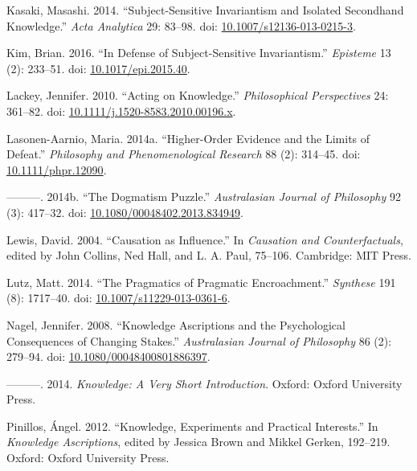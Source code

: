 \documentclass[
  10pt,
  letterpaper,
  DIV=11,
  numbers=noendperiod,
  twoside]{scrartcl}
\newlength{\cslhangindent}
\newenvironment{CSLReferences}[2] %
 {\begin{list}{}{%
  \setlength{\itemindent}{0pt}
  \setlength{\leftmargin}{0pt}
  \setlength{\parsep}{0pt}
  \ifodd #1
   \setlength{\leftmargin}{\cslhangindent}
   \setlength{\itemindent}{-1\cslhangindent}
  \fi
  \setlength{\itemsep}{#2\baselineskip}}}
 {\end{list}}
\begin{document}
\begin{CSLReferences}{1}{0}
Kasaki, Masashi. 2014. {``Subject-Sensitive Invariantism and Isolated
Secondhand Knowledge.''} \emph{Acta Analytica} 29: 83--98. doi:
\href{https://doi.org/10.1007/s12136-013-0215-3}{10.1007/s12136-013-0215-3}.

Kim, Brian. 2016. {``In Defense of Subject-Sensitive Invariantism.''}
\emph{Episteme} 13 (2): 233--51. doi:
\href{https://doi.org/10.1017/epi.2015.40}{10.1017/epi.2015.40}.

Lackey, Jennifer. 2010. {``Acting on Knowledge.''} \emph{Philosophical
Perspectives} 24: 361--82. doi:
\href{https://doi.org/10.1111/j.1520-8583.2010.00196.x}{10.1111/j.1520-8583.2010.00196.x}.

Lasonen-Aarnio, Maria. 2014a. {``Higher-Order Evidence and the Limits of
Defeat.''} \emph{Philosophy and Phenomenological Research} 88 (2):
314--45. doi:
\href{https://doi.org/10.1111/phpr.12090}{10.1111/phpr.12090}.

---------. 2014b. {``The Dogmatism Puzzle.''} \emph{Australasian Journal
of Philosophy} 92 (3): 417--32. doi:
\href{https://doi.org/10.1080/00048402.2013.834949}{10.1080/00048402.2013.834949}.

Lewis, David. 2004. {``Causation as Influence.''} In \emph{Causation and
Counterfactuals}, edited by John Collins, Ned Hall, and L. A. Paul,
75--106. Cambridge: {MIT} Press.

Lutz, Matt. 2014. {``The Pragmatics of Pragmatic Encroachment.''}
\emph{Synthese} 191 (8): 1717--40. doi:
\href{https://doi.org/10.1007/s11229-013-0361-6}{10.1007/s11229-013-0361-6}.

Nagel, Jennifer. 2008. {``Knowledge Ascriptions and the Psychological
Consequences of Changing Stakes.''} \emph{Australasian Journal of
Philosophy} 86 (2): 279--94. doi:
\href{https://doi.org/10.1080/00048400801886397}{10.1080/00048400801886397}.

---------. 2014. \emph{Knowledge: A Very Short Introduction}. Oxford:
Oxford University Press.

Pinillos, Ángel. 2012. {``Knowledge, Experiments and Practical
Interests.''} In \emph{Knowledge Ascriptions}, edited by Jessica Brown
and Mikkel Gerken, 192--219. Oxford: Oxford University Press.


\end{CSLReferences}
\end{document}
